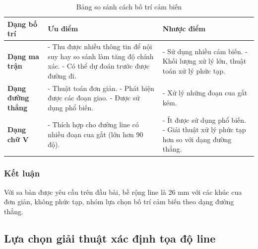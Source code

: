                 \begin{table}[H]
                    \centering
                    \caption{Bảng so sánh cách bố trí cảm biến}
                    \begin{tabular}{|p{3cm}|p{5cm}|p{5cm}|}
                        \hline
                        \textbf{Dạng bố trí} & \textbf{Ưu điểm} & \textbf{Nhược điểm} \\
                        \hline
                        \textbf{Dạng ma trận} &
                        - Thu được nhiều thông tin để nội suy hay so sánh làm tăng độ chính xác. \newline
                        - Có thể dự đoán trước được đường đi. &
                        - Sử dụng nhiều cảm biến. \newline
                        - Khối lượng xử lý lớn, thuật toán xử lý phức tạp. \\ 
                        \hline
                        \textbf{Dạng đường thẳng} &
                        - Thuật toán đơn giản.  \newline
                        - Phát hiện được các đoạn giao. \newline
                        - Được sử dụng phổ biến.  &
                        - Xử lý những đoạn cua gắt kém. \\
                        \hline
                        \textbf{Dạng chữ V} &
                        - Thích hợp cho đường line có nhiều đoạn cua gắt (lớn hơn 90 độ). &
                        - Ít được sử dụng phổ biến. \newline
                        - Giải thuật xử lý phức tạp hơn so với dạng đường thẳng. \\ 
                        \hline
                    \end{tabular}
                    \label{tab:label}
                \end{table}
            \subsubsection{Kết luận}
                \hspace*{0.6cm}Với sa bàn được yêu cầu trên đầu bài, bề rộng line là 26 mm với các khúc cua đơn giản, không phức tạp, nhóm lựa chọn bố trí cảm biến theo dạng đường thẳng. 
        \subsection{Lựa chọn giải thuật xác định tọa độ line}
